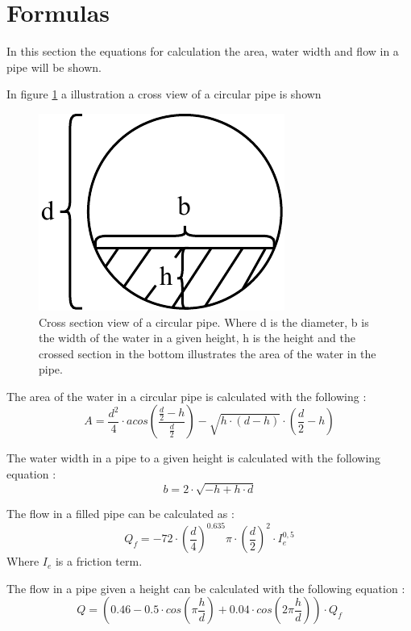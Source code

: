 \newpage
\section{Formulas}\label{app:formulas}
In this section the equations for calculation the area, water width and flow in a pipe will be shown.
%


In figure \ref{fig:calc_water_pipe_width} a illustration a cross view of a circular pipe is shown
\begin{figure}[H]
	\centering
	\includegraphics[width=0.20\textheight]{report/appendix/figures/calc_water_pipe_width.pdf}
	\caption{Cross section view of a circular pipe. Where d is the diameter, b is the width of the water in a given height, h is the height and the crossed section in the bottom illustrates the area of the water in the pipe.}
	\label{fig:calc_water_pipe_width}
\end{figure}

The area of the water in a circular pipe is calculated with the following \cite{ikke_stationear}: 
\begin{equation}%
	A = \frac {d^2}{4} \cdot acos \left(\frac{\frac{d}{2}-h}{\frac{d}{2}}\right)-\sqrt{h\cdot (d-h)}\cdot  \left(\frac{d}{2}-h\right)
\end{equation}

The water width in a pipe to a given height is calculated with the following equation \cite{ikke_stationear}:
\begin{equation}
	b = 2 \cdot \sqrt{-h+h\cdot d}
\end{equation}

The flow in a filled pipe can be calculated as \cite{ikke_stationear}:
\begin{equation}%
	Q_f =-72\cdot \left(\frac{d}{4}\right)^{0.635}\pi\cdot\left(\frac{d}{2}\right)^2\cdot I_e^{0,5}%
\end{equation}
Where $I_e$ is a friction term. 

The flow in a pipe given a height can be calculated with the following equation \cite{ikke_stationear}:
\begin{equation}%
 	Q = \left(0.46-0.5 \cdot cos\left(\pi \frac{h}{d}\right)+0.04\cdot cos\left(2\pi\frac{h}{d}\right)\right)\cdot Q_f
\end{equation}

